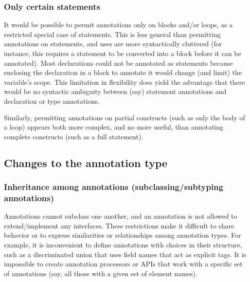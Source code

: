 \documentclass[10pt]{article}
\begin{document}




\subsubsection{Only certain statements}

It would be possible to permit annotations only on blocks and/or loops, as
a restricted special case of statements.  This is less general than
permitting annotations on statements, and uses are more syntactically
cluttered (for instance, this requires a statement to be converted into a
block before it can be annotated).  Most declarations could not be
annotated as statements because enclosing the declaration in a block to
annotate it would change (and limit) the variable's scope.  This limitation
in flexibility does yield the advantage that there would be no syntactic
ambiguity between (say) statement annotations and declaration or type
annotations.

Similarly, permitting annotations on partial constructs (such as only the
body of a loop) appears both more complex, and no more useful, than
annotating complete constructs (such as a full statement).


\subsection{Changes to the annotation type\label{changes-to-the-annotation-type}}


\subsubsection{Inheritance among annotations (subclassing/subtyping annotations)\label{inheritance-among-annotations}}


Annotations cannot subclass one another, and an annotation is not allowed
to extend/implement any interfaces.  These restrictions make it difficult
to share behavior or to express similarities or relationships among
annotation types.  For example, it is inconvenient to define annotations
with choices in their structure, such as a discriminated union that uses
field names that act as explicit tags.  It is impossible to create
annotation processors or APIs that work with a specific set of annotations
(say, all those with a given set of element names).
\end{document}
